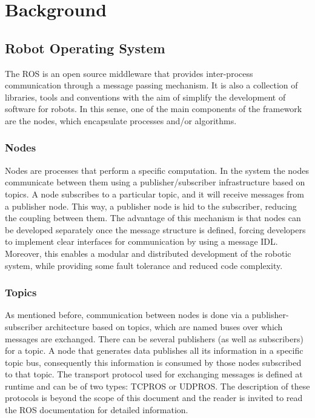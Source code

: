 \cleardoublepage
\chapter{Background}
\label{ch:chapter1}

\section{Robot Operating System}
\label{sec:chapter1:ros}
The \ac{ROS} \cite{ros-website} is an open source middleware that provides inter-process communication through a message passing mechanism. It is also a collection of libraries, tools and conventions with the aim of simplify the development of software for robots. In this sense, one of the main components of the framework are the nodes, which encapsulate processes and/or algorithms.

\subsection{Nodes}
\label{subsec:chapter1:ros:nodes}
Nodes are processes that perform a specific computation. In the system the nodes communicate between them using a publisher/subscriber infrastructure based on topics. A node subscribes to a particular topic, and it will receive messages from a publisher node. This way, a publisher node is hid to the subscriber, reducing the coupling between them. The advantage of this mechanism is that nodes can be developed separately once the message structure is defined, forcing developers to implement clear interfaces for communication by using a message \ac{IDL}. Moreover, this enables a modular and distributed development of the robotic system, while providing some fault tolerance and reduced code complexity.

\subsection{Topics}
\label{subsec:chapter1:ros:topics}
As mentioned before, communication between nodes is done via a publisher-subscriber architecture based on topics, which are named buses over which messages are exchanged. There can be several publishers (as well as subscribers) for a topic. A node that generates data publishes all its information in a specific topic bus, consequently this information is consumed by those nodes subscribed to that topic. The transport protocol used for exchanging messages is defined at runtime and can be of two types: TCPROS or UDPROS. The description of these protocols is beyond the scope of this document and the reader is invited to read the \ac{ROS} documentation for detailed information.


